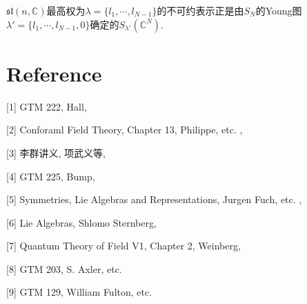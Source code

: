 \documentclass[11pt]{article}
\theoremstyle{definition}
\theoremstyle{plain}
\newcommand{\cc}{\mathbb{C}}
\begin{document}
{\thm $\mathfrak{sl}(n,\cc)$最高权为$\lambda=\{l_1,\cdots,l_{N-1}\}$的不可约表示正是由$S_N$的Young图$\lambda'=\{l_1,\cdots,l_{N-1},0\}$确定的$S_{\lambda'} (\cc^N)$.\endthm}

\clearpage

\section*{Reference}

[1] GTM 222, Hall,

[2] Conforaml Field Theory, Chapter 13, Philippe, etc. ,

[3] 李群讲义, 项武义等, 

[4] GTM 225, Bump,

[5] Symmetries, Lie Algebras and Representations, Jurgen Fuch, etc. ,

[6] Lie Algebras, Shlomo Sternberg,

[7] Quantum Theory of Field V1, Chapter 2, Weinberg,

[8] GTM 203, S. Axler, etc.

[9] GTM 129, William Fulton, etc.
\end{document}
